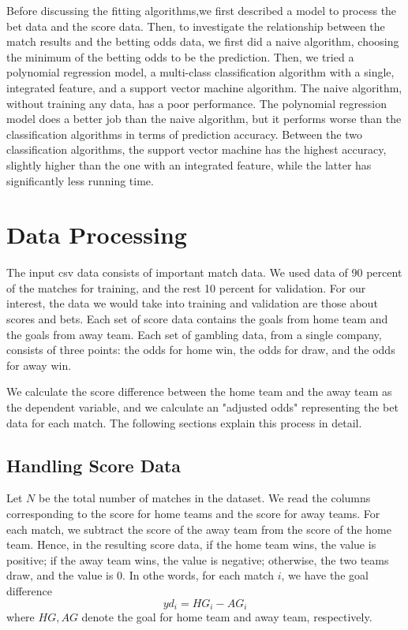 \documentclass{article}
\begin{document}
	Before discussing the fitting algorithms,we first described a model to process the bet data and the score data. Then, to investigate the relationship between the match results and the betting odds data, we first did a naive algorithm, choosing the minimum of the betting odds to be the prediction. Then, we tried a polynomial regression model, a multi-class classification algorithm with a single, integrated feature, and a support vector machine algorithm. The naive algorithm, without training any data, has a poor performance. The polynomial regression model does a better job than the naive algorithm, but it performs worse than the classification algorithms in terms of prediction accuracy. Between the two classification algorithms, the support vector machine has the highest accuracy, slightly higher than the one with an integrated feature, while the latter has significantly less running time.
	
	\section{Data Processing}

	The input csv data consists of important match data. We used data of 90 percent of the matches for training, and the rest 10 percent for validation. For our interest, the data we would take into training and validation are those about scores and bets. Each set of score data contains the goals from home team and the goals from away team. Each set of gambling data, from a single company, consists of three points: the odds for home win, the odds for draw, and the odds for away win.

	We calculate the score difference between the home team and the away team as the dependent variable, and we calculate an "adjusted odds" representing the bet data for each match. The following sections explain this process in detail.
	
	\subsection{Handling Score Data}

	Let $N$ be the total number of matches in the dataset. We read the columns corresponding to the score for home teams and the score for away teams. For each match, we subtract the score of the away team from the score of the home team. Hence, in the resulting score data, if the home team wins, the value is positive; if the away team wins, the value is negative; otherwise, the two teams draw, and the value is 0. In othe words, for each match $i$, we have the goal difference \[
	yd_i = HG_i - AG_i
	\] where $HG, AG$ denote the goal for home team and away team, respectively.
\end{document}
